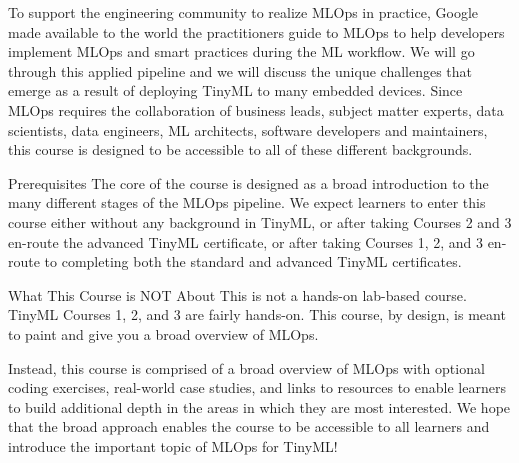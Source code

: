     To support the engineering community to realize MLOps in practice, Google made available to the world the practitioners guide to MLOps to help developers implement MLOps and smart practices during the ML workflow. We will go through this applied pipeline and we will discuss the unique challenges that emerge as a result of deploying TinyML to many embedded devices. Since MLOps requires the collaboration of business leads, subject matter experts, data scientists, data engineers, ML architects, software developers and maintainers, this course is designed to be accessible to all of these different backgrounds.
    
    Prerequisites
    The core of the course is designed as a broad introduction to the many different stages of the MLOps pipeline. We expect learners to enter this course either without any background in TinyML, or after taking Courses 2 and 3 en-route the advanced TinyML certificate, or after taking Courses 1, 2, and 3 en-route to completing both the standard and advanced TinyML certificates.
    
    What This Course is NOT About
    This is not a hands-on lab-based course. TinyML Courses 1, 2, and 3 are fairly hands-on. This course, by design, is meant to paint and give you a broad overview of MLOps. 
    
    Instead, this course is comprised of a broad overview of MLOps with optional coding exercises, real-world case studies, and links to resources to enable learners to build additional depth in the areas in which they are most interested. We hope that the broad approach enables the course to be accessible to all learners and introduce the important topic of MLOps for TinyML!


